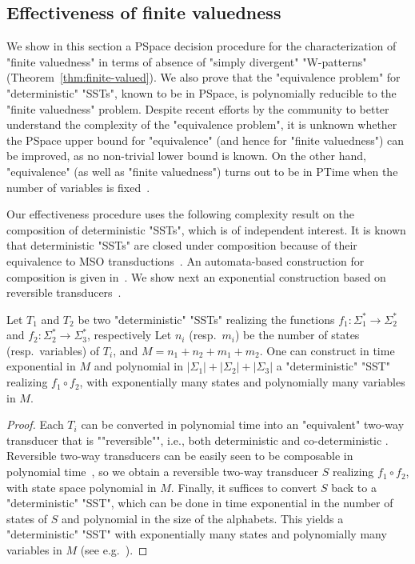 \documentclass{theoretics}
\begin{document}
\subsection{Effectiveness of finite valuedness}\label{subsec:effectiveness}

We show in this section a {\upshape\sc PSpace} decision procedure for the characterization of "finite valuedness" 
in terms of absence of "simply divergent" "W-patterns" 
(Theorem~\ref{thm:finite-valued}). 
We also prove that the "equivalence problem" for "deterministic" "SSTs", 
known to be in {\upshape\sc PSpace}, is polynomially reducible to the 
"finite valuedness" problem. Despite recent efforts by the community 
to better understand the complexity of the "equivalence problem", 
it is unknown whether the {\upshape\sc PSpace} upper bound for "equivalence" 
(and hence for "finite valuedness") can be improved, as no non-trivial 
lower bound is known. 
On the other hand, "equivalence" (as well as "finite valuedness") 
turns out to be in {\upshape\sc PTime} when the number of variables is 
fixed~\cite{DBLP:conf/icalp/AlurD11}. 



Our effectiveness procedure uses the following complexity result on the
composition of deterministic "SSTs", which is of independent interest.
It is known
that deterministic "SSTs" are closed under
composition because of their equivalence to 
MSO transductions~\cite{DBLP:conf/fsttcs/AlurC10}. An automata-based construction for composition is given
in~\cite{DBLP:journals/corr/abs-2209-05448}. We show next an exponential construction 
based on reversible transducers~\cite{DBLP:conf/icalp/DartoisFJL17}. 


\begin{proposition}\label{prop:compo}
Let $T_1$ and $T_2$ be two "deterministic" "SSTs" realizing the functions
$f_1 : \Sigma_1^*\rightarrow \Sigma_2^*$ and $f_2 :
\Sigma_2^*\rightarrow \Sigma_3^*$, respectively
Let $n_i$ (resp.~$m_i$) be the number of states  (resp.~variables) 
of $T_i$, and $M = n_1+n_2+m_1+m_2$. %
One can construct in time exponential in $M$ and 
polynomial in $|\Sigma_1|+|\Sigma_2|+|\Sigma_3|$ 
a "deterministic" "SST" realizing $f_1\circ f_2$, 
with exponentially many states and polynomially many
variables in $M$.
\end{proposition}

\begin{proof}
\AP
Each $T_i$ can be converted in
polynomial time into an "equivalent" 
two-way transducer that is ""reversible"",
i.e., both deterministic and co-deterministic
\cite{DBLP:conf/icalp/DartoisFJL17}. 
Reversible two-way transducers can be easily seen to be composable
in polynomial time~\cite{DBLP:conf/icalp/DartoisFJL17}, so we obtain a reversible two-way transducer $S$ 
realizing $f_1\circ f_2$, with state space polynomial
in $M$. Finally, it suffices to convert $S$ back to a "deterministic" "SST", 
which can be done in time exponential in the number of states of $S$ and polynomial 
in the size of the alphabets. This yields a "deterministic" "SST" with 
exponentially many states and polynomially many variables in $M$ 
(see e.g.~\cite{ledent13,DBLP:journals/ijfcs/DartoisJR18}).
\end{proof}
\end{document}
